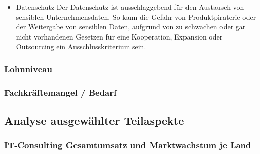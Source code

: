 \begin{itemize}
\item {Datenschutz}
  Der Datenschutz ist ausschlaggebend für den Austausch von sensiblen Unternehmensdaten. 
  So kann die Gefahr von Produktpiraterie oder der Weitergabe von sensiblen Daten, aufgrund von zu schwachen oder gar nicht vorhandenen Gesetzen für eine Kooperation, Expansion oder Outsourcing ein Ausschlusskriterium sein.
  
  \end{itemize}
\subsubsection{Lohnniveau}
\subsubsection{Fachkräftemangel / Bedarf}
\subsection{Analyse ausgewählter Teilaspekte}
\subsubsection{IT-Consulting Gesamtumsatz und Marktwachstum je Land}
\label{subsubsec:Gesamtumsatz}

